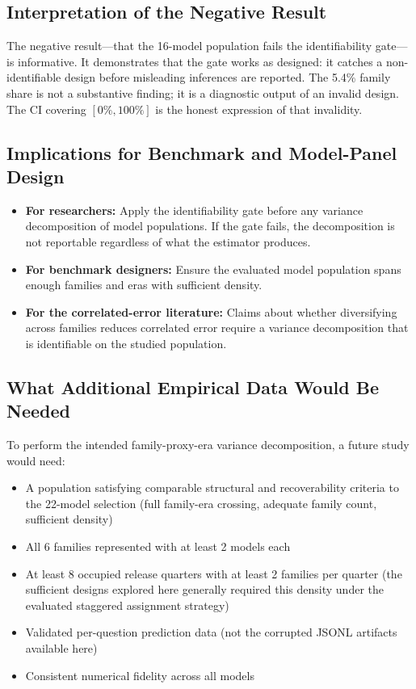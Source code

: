 \documentclass{ieeeaccess}
\theoremstyle{definition}
\theoremstyle{plain}
\begin{document}
\subsection{Interpretation of the Negative Result}
The negative result---that the 16-model population fails the identifiability gate---is informative. It demonstrates that the gate works as designed: it catches a non-identifiable design before misleading inferences are reported. The 5.4\% family share is not a substantive finding; it is a diagnostic output of an invalid design. The CI covering $[0\%, 100\%]$ is the honest expression of that invalidity.

\subsection{Implications for Benchmark and Model-Panel Design}
\begin{itemize}
\item \textbf{For researchers:} Apply the identifiability gate before any variance decomposition of model populations. If the gate fails, the decomposition is not reportable regardless of what the estimator produces.
\item \textbf{For benchmark designers:} Ensure the evaluated model population spans enough families and eras with sufficient density.
\item \textbf{For the correlated-error literature:} Claims about whether diversifying across families reduces correlated error require a variance decomposition that is identifiable on the studied population.
\end{itemize}

\subsection{What Additional Empirical Data Would Be Needed}
To perform the intended family-proxy-era variance decomposition, a future study would need:
\begin{itemize}
\item A population satisfying comparable structural and recoverability criteria to the 22-model selection (full family-era crossing, adequate family count, sufficient density)
\item All 6 families represented with at least 2 models each
\item At least 8 occupied release quarters with at least 2 families per quarter (the sufficient designs explored here generally required this density under the evaluated staggered assignment strategy)
\item Validated per-question prediction data (not the corrupted JSONL artifacts available here)
\item Consistent numerical fidelity across all models
\end{itemize}
\end{document}
